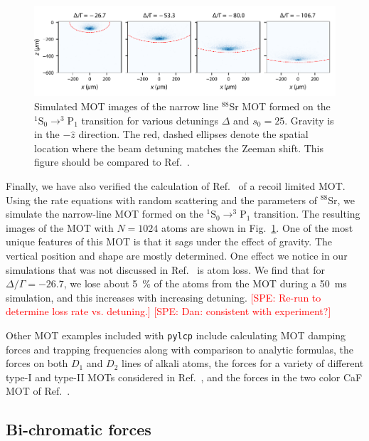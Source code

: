 \documentclass[final,5p,times,twocolumn]{elsarticle}
\newcommand{\SPE}[1]{\textcolor{red}{\textsf{[SPE: #1]}}}
\begin{document}
\begin{figure}
	\center
	\includegraphics{figs/88Sr_red_MOT_differnt_detunings}
	\caption{\label{fig:recoil_limited_MOT} Simulated MOT images of the narrow line $^{88}$Sr MOT formed on the $^1 \mbox{S}_{0}\rightarrow ^3\mbox{P}_1$ transition for various detunings $\Delta$ and $s_0=25$.  Gravity is in the $-\hat{z}$ direction.  The red, dashed ellipses denote the spatial location where the beam detuning matches the Zeeman shift.  This figure should be compared to Ref.~\cite{Hanley2018}.}
\end{figure}

Finally, we have also verified the calculation of Ref.~\cite{Hanley2018} of a recoil limited MOT.   Using the rate equations with random scattering and the parameters of $^{88}$Sr, we simulate the narrow-line MOT formed on the $^1 \mbox{S}_{0}\rightarrow ^3\mbox{P}_1$ transition.  The resulting images of the MOT with $N=1024$ atoms are shown in Fig.~\ref{fig:recoil_limited_MOT}.  One of the most unique features of this MOT is that it sags under the effect of gravity.  The vertical position and shape are mostly determined.  One effect we notice in our simulations that was not discussed in Ref.~\cite{Hanley2018} is atom loss.  We find that for $\Delta/\Gamma=-26.7$, we lose about 5~\% of the atoms from the MOT during a 50~ms simulation, and this increases with increasing detuning.  \SPE{Re-run to determine loss rate vs. detuning.} \SPE{Dan: consistent with experiment?}

Other MOT examples included with {\tt pylcp} include calculating MOT damping forces and trapping frequencies along with comparison to analytic formulas, the forces on both $D_1$ and $D_2$ lines of alkali atoms, the forces for a variety of different type-I and type-II MOTs considered in Ref.~\cite{Tarbutt2015}, and the forces in the two color CaF MOT of Ref.~\cite{Tarbutt2015a}. 

\subsection{Bi-chromatic forces}
\end{document}
